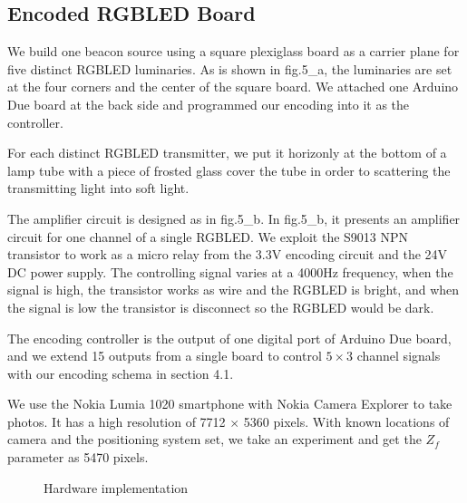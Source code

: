 \documentclass[conference]{IEEEtran}
\begin{document}
\subsection{\textbf{Encoded RGBLED Board}}
We build one beacon source using a square plexiglass board as a carrier plane for five distinct RGBLED luminaries. As is shown in fig.5\_a, the luminaries are set at the four corners and the center of the square board. We attached one Arduino Due board at the back side and programmed our encoding into it as the controller.

For each distinct RGBLED transmitter, we put it horizonly at the bottom of a lamp tube with a piece of frosted glass cover the tube in order to scattering the transmitting light into soft light. 

The amplifier circuit is designed as in fig.5\_b. In fig.5\_b, it presents an amplifier circuit for one channel of a single RGBLED. We exploit the S9013 NPN transistor to work as a micro relay from the 3.3V encoding circuit and the 24V DC power supply. The controlling signal varies at a 4000Hz frequency, when the signal is high, the transistor works as wire and the RGBLED is bright, and when the signal is low the transistor is disconnect so the RGBLED would be dark.

The encoding controller is the output of one digital port of Arduino Due board, and we extend 15 outputs from a single board to control $5 \times 3$ channel signals with our encoding schema in section 4.1.

We use the Nokia Lumia 1020 smartphone with Nokia Camera Explorer to take photos. It has a high resolution of 7712 $\times$ 5360 pixels. With known locations of camera and the positioning system set, we take an experiment and get the $Z_f$ parameter as 5470 pixels.

\begin{figure} \centering
	\caption{Hardware implementation}
\end{figure}
\end{document}
